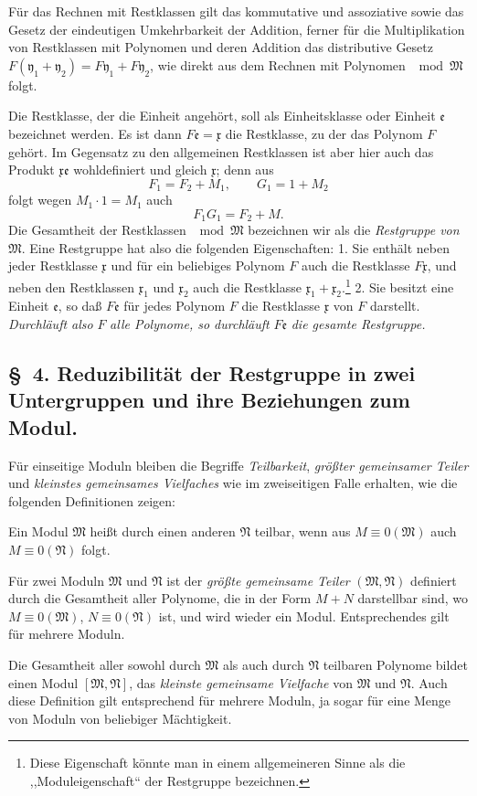 \documentclass[11pt]{article}
\newcommand{\mM}{\mathfrak{M}}
\newcommand{\mN}{\mathfrak{N}}
\newcommand{\mx}{\mathfrak{x}}
\newcommand{\my}{\mathfrak{y}}
\newcommand{\me}{\mathfrak{e}}
\begin{document}
Für das Rechnen mit Restklassen gilt das kommutative und assoziative sowie das Gesetz der eindeutigen Umkehrbarkeit der Addition, ferner für die Multiplikation von Restklassen mit Polynomen und deren Addition das distributive Gesetz $F(\my_1+\my_2)=F\my_1+F\my_2$, wie direkt aus dem Rechnen mit Polynomen $\mod\mM$ folgt.

Die Restklasse, der die Einheit angehört, soll als Einheitsklasse oder Einheit $\me$ bezeichnet werden. Es ist dann $F\me=\mx$ die Restklasse, zu der das Polynom $F$ gehört. Im Gegensatz zu den allgemeinen Restklassen ist aber hier auch das Produkt $\mx\me$ wohldefiniert und gleich $\mx$; denn aus
\[
 F_1=F_2+M_1,\qquad G_1=1+M_2
\]
folgt wegen $M_1\cdot1=M_1$ auch
\[
 F_1G_1=F_2+M.
\]
Die Gesamtheit der Restklassen $\mod\mM$ bezeichnen wir als die \emph{Restgruppe von} $\mM$. Eine Restgruppe hat also die folgenden Eigenschaften: 1. Sie enthält neben jeder Restklasse $\mx$ und für ein beliebiges Polynom $F$ auch die Restklasse $F\mx$, und neben den Restklassen $\mx_1$ und $\mx_2$ auch die Restklasse $\mx_1+\mx_2$.\footnote{Diese Eigenschaft könnte man in einem allgemeineren Sinne als die ,,Moduleigenschaft`` der Restgruppe bezeichnen.} 2. Sie besitzt eine Einheit $\me$, so daß $F\me$ für jedes Polynom $F$ die Restklasse $\mx$ von $F$ darstellt. \emph{Durchläuft also} $F$ \emph{alle Polynome, so durchläuft} $F\me$ \emph{die gesamte Restgruppe.}

\subsection*{\S~4. Reduzibilität der Restgruppe in zwei Untergruppen und ihre Beziehungen zum Modul.}

Für einseitige Moduln bleiben die Begriffe \emph{Teilbarkeit}, \emph{größter gemeinsamer Teiler} und \emph{kleinstes gemeinsames Vielfaches} wie im zweiseitigen Falle erhalten, wie die folgenden Definitionen zeigen:

Ein Modul $\mM$ heißt durch einen anderen $\mN$ teilbar, wenn aus $M\equiv0(\mM)$ auch $M\equiv0(\mN)$ folgt.

Für zwei Moduln $\mM$ und $\mN$ ist der \emph{größte gemeinsame Teiler} $(\mM,\mN)$ definiert durch die Gesamtheit aller Polynome, die in der Form $M+N$ darstellbar sind, wo $M\equiv0(\mM)$, $N\equiv0(\mN)$ ist, und wird wieder ein Modul. Entsprechendes gilt für mehrere Moduln.

Die Gesamtheit aller sowohl durch $\mM$ als auch durch $\mN$ teilbaren Polynome bildet einen Modul $[\mM,\mN]$, das \emph{kleinste gemeinsame Vielfache} von $\mM$ und $\mN$. Auch diese Definition gilt entsprechend für mehrere Moduln, ja sogar für eine Menge von Moduln von beliebiger Mächtigkeit.
\end{document}
